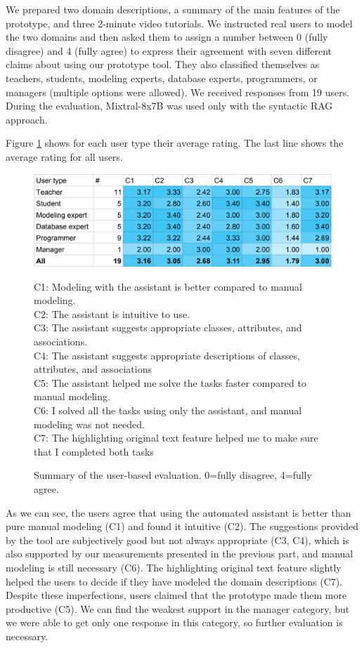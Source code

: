 We prepared two domain descriptions, a summary of the main features of the prototype, and three 2-minute video tutorials. We instructed real users to model the two domains and then asked them to assign a number between 0 (fully disagree) and 4 (fully agree) to express their agreement with seven different claims about using our prototype tool.
They also classified themselves as teachers, students, modeling experts, database experts, programmers, or managers (multiple options were allowed).
We received responses from 19 users. During the evaluation, Mixtral-8x7B was used only with the syntactic RAG approach.

Figure \ref{fig:user-based-evaluation} shows for each user type their average rating. The last line shows the average rating for all users.

\begin{figure}[!h]
    \includegraphics[width=1\linewidth]{img/user-based-evaluation.png} \\
    \scriptsize
\raggedright{C1: Modeling with the assistant is better compared to manual modeling. \\
C2: The assistant is intuitive to use.\\
C3: The assistant suggests appropriate classes, attributes, and associations.\\
C4: The assistant suggests appropriate descriptions of classes, attributes, and associations \\
C5: The assistant helped me solve the tasks faster compared to manual modeling.\\
C6: I solved all the tasks using only the assistant, and manual modeling was not needed. \\
C7: The highlighting original text feature helped me to make sure that I completed both tasks}
    \caption{Summary of the user-based evaluation. 0=fully disagree, 4=fully agree.}
    \label{fig:user-based-evaluation}
\end{figure}

As we can see, the users agree that using the automated assistant is better than pure manual modeling (C1) and found it intuitive (C2).
The suggestions provided by the tool are subjectively good but not always appropriate (C3, C4), which is also supported by our measurements presented in the previous part, and manual modeling is still necessary (C6). The highlighting original text feature slightly helped the users to decide if they have modeled the domain descriptions (C7).
Despite these imperfections, users claimed that the prototype made them more productive (C5).
We can find the weakest support in the manager category, but we were able to get only one response in this category, so further evaluation is necessary.